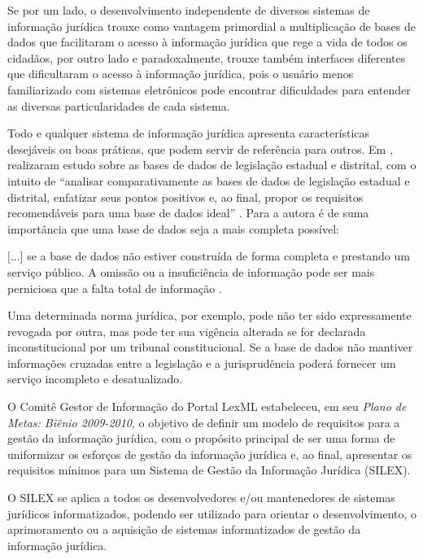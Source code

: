 \documentclass[a4paper,11pt,openright,twoside,english,brazil]{abntex2}
\begin{document}
Se por um lado, o desenvolvimento independente de diversos sistemas de
informação jurídica trouxe como vantagem primordial a multiplicação de bases de
dados que facilitaram o acesso à informação jurídica que rege a vida de todos os
cidadãos, por outro lado e paradoxalmente, trouxe também interfaces diferentes
que dificultaram o acesso à informação jurídica, pois o usuário menos
familiarizado com sistemas eletrônicos pode encontrar dificuldades para entender
as diversas particularidades de cada sistema.

Todo e qualquer sistema de informação jurídica apresenta características
desejáveis ou boas práticas, que podem servir de referência para outros. Em
\citeyear{passos2009},  realizaram estudo sobre as
bases de dados de legislação estadual e distrital, com o intuito de ``analisar
comparativamente as bases de dados de legislação estadual e distrital, enfatizar
seus pontos positivos e, ao final, propor os requisitos recomendáveis para uma
base de dados ideal'' \cite[p.~17]{passos2009}. Para a autora é de suma
importância que uma base de dados seja a mais completa possível:

\begin{citacao}
 $[$...$]$ se a base de dados não estiver construída de forma completa e
prestando um serviço público. A omissão ou a insuficiência de informação pode
ser mais perniciosa que a falta total de informação \cite[p.~17]{passos2009}.
\end{citacao}

Uma determinada norma jurídica, por exemplo, pode não ter sido expressamente
revogada por outra, mas pode ter sua vigência alterada se for declarada
inconstitucional por um tribunal constitucional. Se a base de dados não mantiver
informações cruzadas entre a legislação e a jurisprudência poderá fornecer um
serviço incompleto e desatualizado.

O Comitê Gestor de Informação do Portal LexML estabeleceu, em seu \emph{Plano de
Metas: Biênio 2009-2010}, o objetivo de definir um modelo de requisitos para a
gestão da informação jurídica, com o propósito principal de ser uma forma de
uniformizar os esforços de gestão da informação jurídica e, ao final, apresentar
os requisitos mínimos para um Sistema de Gestão da Informação Jurídica (SILEX).

O SILEX se aplica a todos os desenvolvedores e/ou mantenedores de sistemas
jurídicos informatizados, podendo ser utilizado para orientar o desenvolvimento,
o aprimoramento ou a aquisição de sistemas informatizados de gestão da
informação jurídica.
\end{document}
